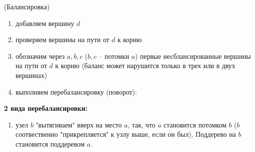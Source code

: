 \begin{algoritm}(Балансировка)
    
    \begin{enumerate}
        \item добавляем вершину $d$
        \item проверяем вершины на пути от $d$ к корню
        \item обозначим через $a, b, c$ ($b, c$ -- потомки $a$) первые несблансированные вершины на пути от $d$ к корню (баланс может нарушится только в трех или в двух вершинах)
        \item выполняем перебалансировку (поворот):
    \end{enumerate}


    \textbf{2 вида перебалансировки:}
    \begin{enumerate}
        \item узел $b$ "вытягиваем" вверх на место $a$, так, что $a$ становится потомком $b$ ($b$ соотвественно "прикрепляется" к узлу выше, если он был). Поддерево на $b$ становится поддеревом $a$.
        

\end{enumerate}
\end{algoritm}
